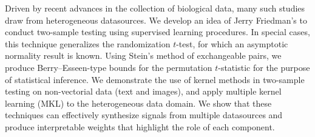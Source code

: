 Driven by recent advances in the collection of biological data,
many such studies draw from heterogeneous datasources.  We develop
an idea of Jerry Friedman's to conduct two-sample testing using
supervised learning procedures.  In special cases, this technique
generalizes the randomization $t$-test, for which an asymptotic
normality result is known.  Using Stein's method of exchangeable
pairs, we produce Berry--Esseen-type bounds for the permutation
$t$-statistic for the purpose of statistical inference.  We demonstrate
the use of kernel methods in two-sample testing on non-vectorial data
(text and images), and apply multiple kernel learning (MKL) to the
heterogeneous data domain.  We show that these techniques can
effectively synthesize signals from multiple datasources and produce
interpretable weights that highlight the role of each component.